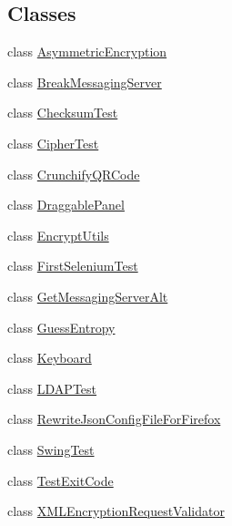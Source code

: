 \subsection*{Classes}
\begin{DoxyCompactItemize}
\item 
class \hyperlink{classgov_1_1fnal_1_1ppd_1_1dd_1_1testing_1_1AsymmetricEncryption}{Asymmetric\-Encryption}
\item 
class \hyperlink{classgov_1_1fnal_1_1ppd_1_1dd_1_1testing_1_1BreakMessagingServer}{Break\-Messaging\-Server}
\item 
class \hyperlink{classgov_1_1fnal_1_1ppd_1_1dd_1_1testing_1_1ChecksumTest}{Checksum\-Test}
\item 
class \hyperlink{classgov_1_1fnal_1_1ppd_1_1dd_1_1testing_1_1CipherTest}{Cipher\-Test}
\item 
class \hyperlink{classgov_1_1fnal_1_1ppd_1_1dd_1_1testing_1_1CrunchifyQRCode}{Crunchify\-Q\-R\-Code}
\item 
class \hyperlink{classgov_1_1fnal_1_1ppd_1_1dd_1_1testing_1_1DraggablePanel}{Draggable\-Panel}
\item 
class \hyperlink{classgov_1_1fnal_1_1ppd_1_1dd_1_1testing_1_1EncryptUtils}{Encrypt\-Utils}
\item 
class \hyperlink{classgov_1_1fnal_1_1ppd_1_1dd_1_1testing_1_1FirstSeleniumTest}{First\-Selenium\-Test}
\item 
class \hyperlink{classgov_1_1fnal_1_1ppd_1_1dd_1_1testing_1_1GetMessagingServerAlt}{Get\-Messaging\-Server\-Alt}
\item 
class \hyperlink{classgov_1_1fnal_1_1ppd_1_1dd_1_1testing_1_1GuessEntropy}{Guess\-Entropy}
\item 
class \hyperlink{classgov_1_1fnal_1_1ppd_1_1dd_1_1testing_1_1Keyboard}{Keyboard}
\item 
class \hyperlink{classgov_1_1fnal_1_1ppd_1_1dd_1_1testing_1_1LDAPTest}{L\-D\-A\-P\-Test}
\item 
class \hyperlink{classgov_1_1fnal_1_1ppd_1_1dd_1_1testing_1_1RewriteJsonConfigFileForFirefox}{Rewrite\-Json\-Config\-File\-For\-Firefox}
\item 
class \hyperlink{classgov_1_1fnal_1_1ppd_1_1dd_1_1testing_1_1SwingTest}{Swing\-Test}
\item 
class \hyperlink{classgov_1_1fnal_1_1ppd_1_1dd_1_1testing_1_1TestExitCode}{Test\-Exit\-Code}
\item 
class \hyperlink{classgov_1_1fnal_1_1ppd_1_1dd_1_1testing_1_1XMLEncryptionRequestValidator}{X\-M\-L\-Encryption\-Request\-Validator}
\end{DoxyCompactItemize}
